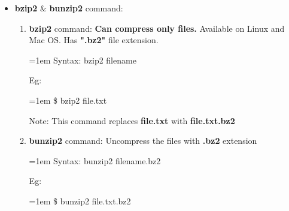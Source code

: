 \begin{flushleft}
\begin{itemize}
		

	\item \textbf{bzip2} \& \textbf{bunzip2} command:
	\begin{enumerate}
		\item \textbf{bzip2} command: \textbf{Can compress only files.} Available on Linux and Mac OS. Has \textbf{".bz2"} file extension.
		\bigskip
		\begin{tcolorbox}[breakable,notitle,boxrule=0pt,colback=pink,colframe=pink]
			\color{black}
			\font=1em
			Syntax: bzip2 filename
			\font=4pt
		\end{tcolorbox}
		Eg:
		\begin{tcolorbox}[breakable,notitle,boxrule=-0pt,colback=black,colframe=black]
			\color{green}
			\font=1em
			\$ bzip2 file.txt
			\font=4pt
		\end{tcolorbox}
		
		\bigskip
		\begin{tcolorbox}[breakable,notitle,boxrule=0pt,colback=yellow,colframe=yellow]
			\color{black}
			Note: This command replaces \textbf{file.txt} with \textbf{file.txt.bz2}
		\end{tcolorbox}
		
		
		\item \textbf{bunzip2} command: Uncompress the files with \textbf{.bz2} extension
		\bigskip
		\begin{tcolorbox}[breakable,notitle,boxrule=0pt,colback=pink,colframe=pink]
			\color{black}
			\font=1em
			Syntax: bunzip2 filename.bz2
			\font=4pt
		\end{tcolorbox}
		Eg:
		\begin{tcolorbox}[breakable,notitle,boxrule=-0pt,colback=black,colframe=black]
			\color{green}
			\font=1em
			\$ bunzip2 file.txt.bz2
			\font=4pt
		\end{tcolorbox}		
	\end{enumerate}		

	\newpage


\end{itemize}
\end{flushleft}
